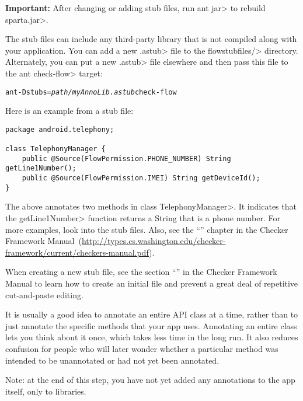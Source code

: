 \noindent
\textbf{Important:}
After changing or adding stub files, run \<ant jar> to rebuild \<sparta.jar>.



The stub files can include any third-party library that is not compiled
along with your application.  You can add a new \<.astub> file to the
\<flowstubfiles/> directory.
Alternately, you can put a new \<.astub> file elsewhere and then pass this
file to the \<ant check-flow> target:

\begin{alltt}
ant -Dstubs=\emph{path/myAnnoLib.astub} check-flow
\end{alltt}

Here is an example from a stub file:

\begin{Verbatim}
package android.telephony;

class TelephonyManager {
    public @Source(FlowPermission.PHONE_NUMBER) String getLine1Number();
    public @Source(FlowPermission.IMEI) String getDeviceId();
}
\end{Verbatim}

\noindent
The above annotates two methods in class \<TelephonyManager>.
It indicates that the \<getLine1Number> function returns a String that is a
phone number.  For more examples, look into the stub files. Also, see 
the
``'' chapter in the Checker Framework Manual\ifhevea\else\ (\url{http://types.cs.washington.edu/checker-framework/current/checkers-manual.pdf})\fi.


When creating a new stub file, see the section
``'' in the Checker Framework Manual to learn how to create an
initial file and prevent a great deal of repetitive cut-and-paste editing.


It is usually a good idea to annotate an entire API class at a time, rather
than to just annotate the specific methods that your app uses.  Annotating
an entire class lets you think about it once, which takes less time in the
long run.  It also reduces confusion for people who will later wonder
whether a particular method was intended to be unannotated or had not yet
been annotated.


Note: at the end of this step, you have not yet added any annotations to
the app itself, only to libraries.

